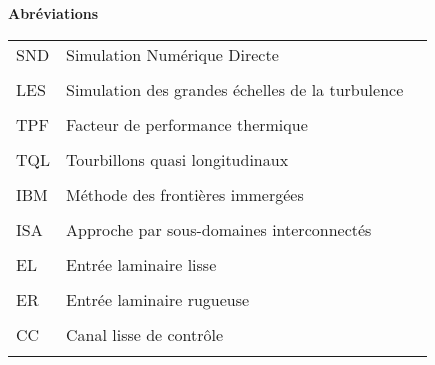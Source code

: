 \vspace{1.5cm}
\noindent \textbf{Abréviations}
\vspace{-1.25cm}
\begin{center}
\begin{tabular}{ m{3cm} m{11.5cm} m{1cm} } 
\\
SND & Simulation Numérique Directe &  \\
\\[-2.625em]
LES & Simulation des grandes échelles de la turbulence &  \\
\\[-2.625em]
TPF & Facteur de performance thermique &  \\
\\[-2.625em]
TQL & Tourbillons quasi longitudinaux &  \\
\\[-2.625em]
IBM & Méthode des frontières immergées &  \\
\\[-2.625em]
ISA & Approche par sous-domaines interconnectés &  \\
\\[-2.625em]
EL & Entrée laminaire lisse &  \\
\\[-2.625em]
ER & Entrée laminaire rugueuse &  \\
\\[-2.625em]
CC & Canal lisse de contrôle &  \\
\\[-2.625em]
\end{tabular}
\end{center}



